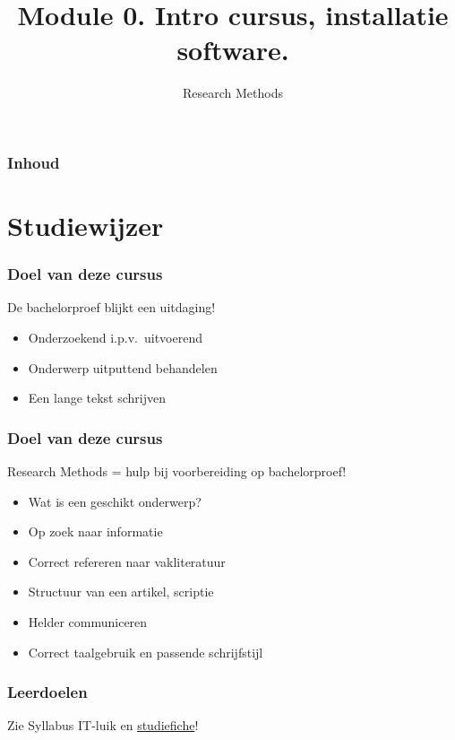 \documentclass[aspectratio=169]{beamer}
\title{Module 0. Intro cursus, installatie software.}
\subtitle{Research Methods}
\author{\lecturers}   %
\date{\academicyear}
\begin{document}
\begin{frame}
  \maketitle
\end{frame}

\begin{frame}
  \frametitle{Inhoud}

  \tableofcontents
\end{frame}

\section{Studiewijzer}

\begin{frame}
  \frametitle{Doel van deze cursus}

  De bachelorproef blijkt een uitdaging!

  \begin{itemize}
    \item Onderzoekend i.p.v.\ uitvoerend
    \item Onderwerp uitputtend behandelen
    \item Een lange tekst schrijven
  \end{itemize}

\end{frame}

\begin{frame}
  \frametitle{Doel van deze cursus}

  Research Methods = hulp bij voorbereiding op bachelorproef!

  \begin{itemize}
    \item Wat is een geschikt onderwerp?
    \item Op zoek naar informatie
    \item Correct refereren naar vakliteratuur
    \item Structuur van een artikel, scriptie
    \item Helder communiceren
    \item Correct taalgebruik en passende schrijfstijl
  \end{itemize}
\end{frame}

\begin{frame}
  \frametitle{Leerdoelen}

  Zie Syllabus IT-luik en \href{https://bamaflexweb.hogent.be/BMFUIDetailxOLOD.aspx?a=134982&b=5&c=1}{studiefiche}!
\end{frame}
\end{document}
